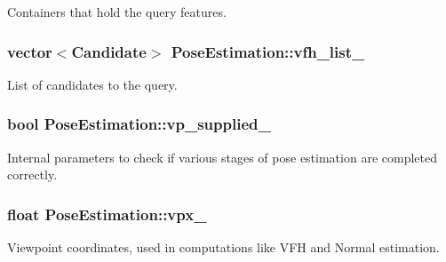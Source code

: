 Containers that hold the query features. 

\hypertarget{classPoseEstimation_ac75bed8cd5eea4f58b3c68336801977a}{
\subsubsection[{vfh\-\_\-list\-\_\-}]{\setlength{\rightskip}{0pt plus 5cm}vector$<${\bf Candidate}$>$ Pose\-Estimation\-::vfh\-\_\-list\-\_\-\hspace{0.3cm}{\ttfamily [private]}}}\label{classPoseEstimation_ac75bed8cd5eea4f58b3c68336801977a}


List of candidates to the query. 

\hypertarget{classPoseEstimation_a1e1d26efa152cca49892e2458f0e5842}{
\subsubsection[{vp\-\_\-supplied\-\_\-}]{\setlength{\rightskip}{0pt plus 5cm}bool Pose\-Estimation\-::vp\-\_\-supplied\-\_\-\hspace{0.3cm}{\ttfamily [private]}}}\label{classPoseEstimation_a1e1d26efa152cca49892e2458f0e5842}


Internal parameters to check if various stages of pose estimation are completed correctly. 

\hypertarget{classPoseEstimation_ab9e6a36597bef9a8f3a831423bdae1c9}{
\subsubsection[{vpx\-\_\-}]{\setlength{\rightskip}{0pt plus 5cm}float Pose\-Estimation\-::vpx\-\_\-\hspace{0.3cm}{\ttfamily [private]}}}\label{classPoseEstimation_ab9e6a36597bef9a8f3a831423bdae1c9}


Viewpoint coordinates, used in computations like V\-F\-H and Normal estimation. 

